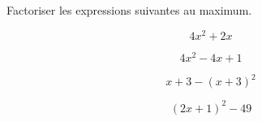  Factoriser les expressions suivantes au maximum.

\begin{multicols}{4}
	 $$4x^2+2x$$

	 $$4x^2-4x+1$$ 

	 $$x+3-(x+3)^2$$

	 $$(2x+1)^2-49$$
\end{multicols}

